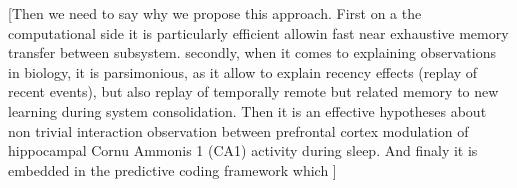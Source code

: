 \documentclass[10pt,letterpaper]{article}
\theoremstyle{plain}
\theoremstyle{remark}
\begin{document}
[Then we need to say why we propose this approach. First on a the computational side it is particularly efficient allowin fast near exhaustive memory transfer between subsystem. secondly, when it comes to explaining observations in biology, it is parsimonious, as it allow to explain recency effects (replay of recent events), but also replay of temporally remote but related memory to new learning during system consolidation. Then it is an effective hypotheses about non trivial interaction observation between prefrontal cortex modulation of hippocampal Cornu Ammonis 1 (CA1) activity during sleep. And finaly it is embedded in the predictive coding framework which ] 



\linenumbers

\end{document}
